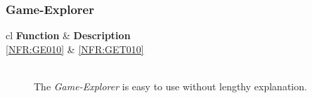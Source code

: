 \subsubsection{Game-Explorer}
\begin{tabular}{{c}{l}}
    \hline
    \textbf{Function} & \textbf{Description} \\ \hline
	\ref{NFR:GE010} & \ref{NFR:GET010} \\ \hline
\end{tabular}

\vspace{.5cm}

\begin{description}
	\item[] \textbf{}  \\
	The \emph{Game-Explorer} is easy to use without lengthy explanation.
\end{description}
